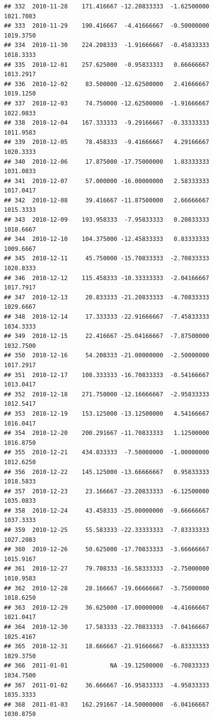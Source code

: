 \documentclass[
]{article}
\begin{document}
\begin{verbatim}
## 332  2010-11-28    171.416667 -12.20833333  -1.62500000    1021.7083
## 333  2010-11-29    190.416667  -4.41666667  -0.50000000    1019.3750
## 334  2010-11-30    224.208333  -1.91666667  -0.45833333    1018.3333
## 335  2010-12-01    257.625000  -0.95833333   0.66666667    1013.2917
## 336  2010-12-02     83.500000 -12.62500000   2.41666667    1019.1250
## 337  2010-12-03     74.750000 -12.62500000  -1.91666667    1022.0833
## 338  2010-12-04    167.333333  -9.29166667  -0.33333333    1011.9583
## 339  2010-12-05     78.458333  -9.41666667   4.29166667    1020.3333
## 340  2010-12-06     17.875000 -17.75000000   1.83333333    1031.0833
## 341  2010-12-07     57.000000 -16.00000000   2.58333333    1017.0417
## 342  2010-12-08     39.416667 -11.87500000   2.66666667    1015.3333
## 343  2010-12-09    193.958333  -7.95833333   0.20833333    1010.6667
## 344  2010-12-10    104.375000 -12.45833333   0.83333333    1009.6667
## 345  2010-12-11     45.750000 -15.70833333  -2.70833333    1020.8333
## 346  2010-12-12    115.458333 -10.33333333  -2.04166667    1017.7917
## 347  2010-12-13     20.833333 -21.20833333  -4.70833333    1029.6667
## 348  2010-12-14     17.333333 -22.91666667  -7.45833333    1034.3333
## 349  2010-12-15     22.416667 -25.04166667  -7.87500000    1032.7500
## 350  2010-12-16     54.208333 -21.00000000  -2.50000000    1017.2917
## 351  2010-12-17    108.333333 -16.70833333  -0.54166667    1013.0417
## 352  2010-12-18    271.750000 -12.16666667  -2.95833333    1012.5417
## 353  2010-12-19    153.125000 -13.12500000   4.54166667    1016.0417
## 354  2010-12-20    200.291667 -11.70833333   1.12500000    1016.8750
## 355  2010-12-21    434.833333  -7.50000000  -1.00000000    1012.6250
## 356  2010-12-22    145.125000 -13.66666667   0.95833333    1018.5833
## 357  2010-12-23     23.166667 -23.20833333  -6.12500000    1035.0833
## 358  2010-12-24     43.458333 -25.00000000  -9.66666667    1037.3333
## 359  2010-12-25     55.583333 -22.33333333  -7.83333333    1027.2083
## 360  2010-12-26     50.625000 -17.70833333  -3.66666667    1015.9167
## 361  2010-12-27     79.708333 -16.58333333  -2.75000000    1010.9583
## 362  2010-12-28     28.166667 -19.66666667  -3.75000000    1018.6250
## 363  2010-12-29     36.625000 -17.00000000  -4.41666667    1021.0417
## 364  2010-12-30     17.583333 -22.70833333  -7.04166667    1025.4167
## 365  2010-12-31     18.666667 -21.91666667  -6.83333333    1029.3750
## 366  2011-01-01            NA -19.12500000  -6.70833333    1034.7500
## 367  2011-01-02     36.666667 -16.95833333  -4.95833333    1035.3333
## 368  2011-01-03    162.291667 -14.50000000  -6.04166667    1030.8750

\end{verbatim}
\end{document}
